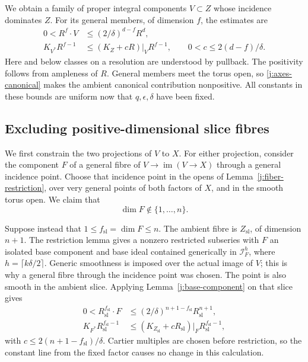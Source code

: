 We obtain a family of proper integral components $V\subset Z$ whose
incidence dominates $Z$. For its general members, of dimension $f$,
the estimates are
\begin{equation}\label{j:total-component-bounds}
 \begin{split}
 0<R^f\cdot V&\le(2/\delta)^{d-f}R^d,\\
 K_{V^*}R^{f-1}&\le(K_Z+cR)|_V R^{f-1},
 \qquad 0<c\le2(d-f)/\delta.
 \end{split}
\end{equation}
Here and below classes on a resolution are understood by pullback.
The positivity follows from ampleness of $R$. General members meet
the torus open, so \eqref{j:axes-canonical} makes the ambient
canonical contribution nonpositive. All constants in these bounds
are uniform now that $q,\epsilon,\delta$ have been fixed.

\subsection{Excluding positive-dimensional slice fibres}

We first constrain the two projections of $V$ to $X$. For either
projection, consider the component $F$ of a general fibre of
$V\to\operatorname{im}(V\to X)$ through a general incidence point.
Choose that incidence point in the opens of
Lemma~\ref{j:fiber-restriction}, over very general points of both
factors of $X$, and in the smooth torus open. We claim that
\begin{equation}\label{j:no-intermediate-fibre}
                         \dim F\notin\{1,\ldots,n\}.
\end{equation}

Suppose instead that $1\le f_{\mathrm{sl}}=\dim F\le n$.
The ambient fibre is $Z_{\mathrm{sl}}$, of dimension $n+1$.
The restriction lemma gives a nonzero restricted subseries with
$F$ an isolated base component and base ideal contained generically
in $\mathcal I_F^h$, where $h=\lceil k\delta/2\rceil$.
Generic smoothness is imposed over the actual image of $V$; this is
why a general fibre through the incidence point was chosen.
The point is also smooth in the ambient slice. Applying
Lemma~\ref{j:base-component} on that slice gives
\begin{equation}\label{j:slice-bounds}
 \begin{split}
 0<R_{\mathrm{sl}}^{f_{\mathrm{sl}}}\cdot F
   &\le(2/\delta)^{n+1-f_{\mathrm{sl}}}
                      R_{\mathrm{sl}}^{n+1},\\
 K_{F^*}R_{\mathrm{sl}}^{f_{\mathrm{sl}}-1}
   &\le(K_{Z_{\mathrm{sl}}}+cR_{\mathrm{sl}})|_F
                      R_{\mathrm{sl}}^{f_{\mathrm{sl}}-1},
 \end{split}
\end{equation}
with $c\le2(n+1-f_{\mathrm{sl}})/\delta$. Cartier multiples are
chosen before restriction, so the constant line from the fixed
factor causes no change in this calculation.

